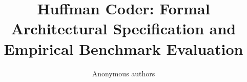 \title{\textbf{Huffman Coder: Formal Architectural Specification and Empirical Benchmark Evaluation}}

\author{Anonymous authors}
